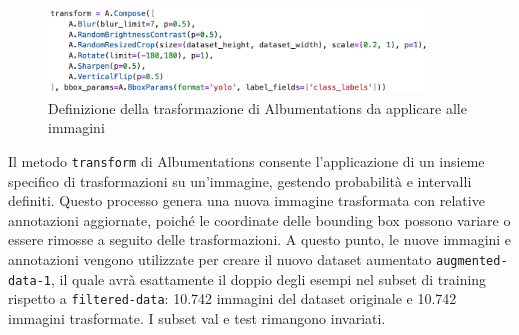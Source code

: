 \begin{figure}[ht]
    \centering
    \includegraphics[width=0.9\textwidth]{files/capitoli/4-sperimentazione-risultati/assets/transform-1.png}
    \caption{\label{fig:transform-1}Definizione della trasformazione di Albumentations da applicare alle immagini}
\end{figure}

Il metodo \texttt{transform} di Albumentations consente l'applicazione di un insieme specifico di trasformazioni su un'immagine, gestendo probabilità e intervalli definiti. Questo processo genera una nuova immagine trasformata con relative annotazioni aggiornate, poiché le coordinate delle bounding box possono variare o essere rimosse a seguito delle trasformazioni.
A questo punto, le nuove immagini e annotazioni vengono utilizzate per creare il nuovo dataset aumentato \texttt{augmented-data-1}, il quale avrà esattamente il doppio degli esempi nel subset di training rispetto a \texttt{filtered-data}: 10.742 immagini del dataset originale e 10.742 immagini trasformate.
I subset val e test rimangono invariati.

\clearpage

